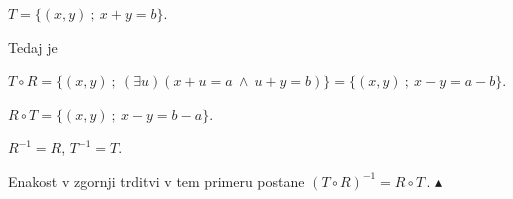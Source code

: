 \documentclass[11pt,paper=b5,footinclude,headinclude]{scrbook} %
\def\ali {{~\vee~}}
\def\inn {{~\wedge~}}
\def\sledi {{~\Rightarrow~}}
\def\brez {{\,\setminus\,}}
\def\cee {{~\Leftrightarrow~}}
\def\kz{{\hfill{\color{blue}$\blacktriangle$}}}%
\begin{document}
$T = \{(x,y)~;~x+y = b\}$.

Tedaj je

$T\circ R = \{(x,y)~;~(\exists u)(x+u = a\inn u+y = b)\}=\{(x,y)~;~x-y = a-b\}$.

$R\circ T = \{(x,y)~;~x-y = b-a\}$.

$R^{-1}= R$, $T^{-1} = T$.

Enakost v zgornji trditvi v tem primeru postane
$(T\circ R)^{-1} = R \circ T\,.$
\kz

%
%
%
%
%
%
%
%
%
%
%
%
%
%
%
%
%
%
%
%
%
%
%
%
%
%
%
%
%
%
%
%
%
%
%
\end{document}
